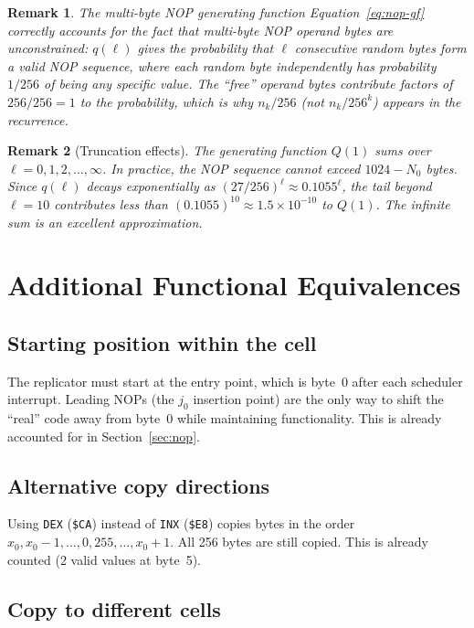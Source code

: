 \documentclass{article}
\newcommand{\hex}[1]{\texttt{\$#1}}
\newcommand{\opcode}[1]{\texttt{#1}}
\newtheorem{remark}{Remark}
\begin{document}
\begin{remark}
The multi-byte NOP generating function Equation~\eqref{eq:nop-gf}
correctly accounts for the fact that multi-byte NOP operand bytes are
unconstrained: $q(\ell)$ gives the probability that $\ell$ consecutive
\emph{random} bytes form a valid NOP sequence, where each random byte
independently has probability $1/256$ of being any specific value.
The ``free'' operand bytes contribute factors of $256/256 = 1$ to the
probability, which is why $n_k/256$ (not $n_k/256^k$) appears in the
recurrence.
\end{remark}

\begin{remark}[Truncation effects]
The generating function $Q(1)$ sums over $\ell = 0, 1, 2, \ldots, \infty$.
In practice, the NOP sequence cannot exceed $1024 - N_0$ bytes.
Since $q(\ell)$ decays exponentially as $(27/256)^\ell \approx 0.1055^\ell$,
the tail beyond $\ell = 10$ contributes less than $(0.1055)^{10} \approx
1.5 \times 10^{-10}$ to $Q(1)$. The infinite sum is an excellent
approximation.
\end{remark}

\section{Additional Functional Equivalences}
\label{sec:other}

\subsection{Starting position within the cell}

The replicator must start at the entry point, which is byte~0 after
each scheduler interrupt. Leading NOPs (the $j_0$ insertion point) are
the only way to shift the ``real'' code away from byte~0 while
maintaining functionality. This is already accounted for in
Section~\ref{sec:nop}.

\subsection{Alternative copy directions}

Using \opcode{DEX} (\hex{CA}) instead of \opcode{INX} (\hex{E8}) copies
bytes in the order $x_0, x_0 - 1, \ldots, 0, 255, \ldots, x_0 + 1$.
All 256 bytes are still copied. This is already counted (2 valid values
at byte~5).

\subsection{Copy to different cells}
\end{document}
